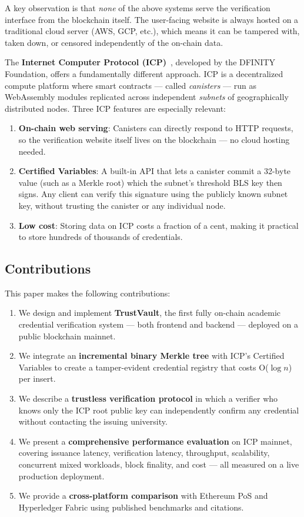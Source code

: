 \documentclass[conference]{IEEEtran}
\begin{document}
A key observation is that \emph{none} of the above systems serve the verification interface from the blockchain itself. The user-facing website is always hosted on a traditional cloud server (AWS, GCP, etc.), which means it can be tampered with, taken down, or censored independently of the on-chain data.

The \textbf{Internet Computer Protocol (ICP)}~\cite{hanke2018dfinity}, developed by the DFINITY Foundation, offers a fundamentally different approach. ICP is a decentralized compute platform where smart contracts — called \emph{canisters} — run as WebAssembly modules replicated across independent \emph{subnets} of geographically distributed nodes. Three ICP features are especially relevant:

\begin{enumerate}
  \item \textbf{On-chain web serving}: Canisters can directly respond to HTTP requests, so the verification website itself lives on the blockchain — no cloud hosting needed.
  \item \textbf{Certified Variables}: A built-in API that lets a canister commit a 32-byte value (such as a Merkle root) which the subnet's threshold BLS key then signs. Any client can verify this signature using the publicly known subnet key, without trusting the canister or any individual node.
  \item \textbf{Low cost}: Storing data on ICP costs a fraction of a cent, making it practical to store hundreds of thousands of credentials.
\end{enumerate}

\subsection{Contributions}

This paper makes the following contributions:

\begin{enumerate}
  \item We design and implement \textbf{TrustVault}, the first fully on-chain academic credential verification system — both frontend and backend — deployed on a public blockchain mainnet.
  \item We integrate an \textbf{incremental binary Merkle tree} with ICP's Certified Variables to create a tamper-evident credential registry that costs O($\log n$) per insert.
  \item We describe a \textbf{trustless verification protocol} in which a verifier who knows only the ICP root public key can independently confirm any credential without contacting the issuing university.
  \item We present a \textbf{comprehensive performance evaluation} on ICP mainnet, covering issuance latency, verification latency, throughput, scalability, concurrent mixed workloads, block finality, and cost — all measured on a live production deployment.
  \item We provide a \textbf{cross-platform comparison} with Ethereum PoS and Hyperledger Fabric using published benchmarks and citations.
\end{enumerate}
\end{document}
